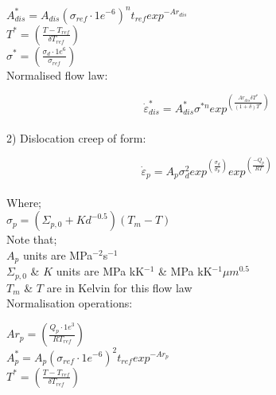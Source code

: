 \documentclass[]{scrreprt}
\begin{document}
$A_{dis}^* = A_{dis}\left(\sigma_{ref}\cdot1e^{-6}\right)^n t_{ref} exp^{-Ar_{dis}}$\\

$T^* = \left(\frac{T-T_{ref}}{\delta T_{ref}}\right)$\\

$\sigma^* = \left(\frac{\sigma_d\cdot1e^6}{\sigma_{ref}}\right)$\\

Normalised flow law:

\begin{equation}
 \label{eq:norm_dislocation_creep}
\dot{\varepsilon}_{dis}^* = A_{dis}^* \sigma^{*n} exp^{\left(\frac{Ar_{dis} \delta T^*}{\left(1+\delta\right)T^*}\right)}
\end{equation}\\

2) Dislocation creep of form:

\begin{equation}
 \label{eq:dislocation_creep_renner_2002}
\dot{\varepsilon}_{p} = A_{p} \sigma_d^2 exp^{\left(\frac{\sigma_d}{\sigma_{p}}\right)} exp^{\left(\frac{-Q_{p}}{RT}\right)}
\end{equation}\\

Where;\\

$\sigma_{p} = \left(\Sigma_{p,0} + K d^{-0.5}\right) \left(T_m - T\right)$\\

Note that;\\

$A_{p}$ units are MPa$^{-2}$s$^{-1}$\\

$\Sigma_{p,0}$ \& $K$ units are MPa kK$^{-1}$ \& MPa kK$^{-1}\mu m^{0.5}$ \\

$T_m$ \& $T$ are in Kelvin for this flow law\\ 


Normalisation operations:

$Ar_{p} = \left(\frac{Q_{p}\cdot1e^3}{RT_{ref}}\right)$\\

$A_{p}^* = A_{p}\left(\sigma_{ref}\cdot1e^{-6}\right)^2 t_{ref} exp^{-Ar_{p}}$\\

$T^* = \left(\frac{T-T_{ref}}{\delta T_{ref}}\right)$\\
\end{document}
